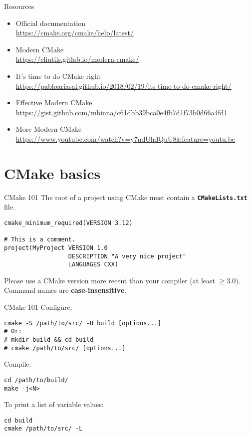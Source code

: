 \documentclass[aspectratio=169,11pt]{beamer}
\begin{document}
\begin{frame}{Resources}
\begin{itemize}
    \item Official documentation\\
    \url{https://cmake.org/cmake/help/latest/}
    \vfill
    \item Modern CMake\\
    \url{https://cliutils.gitlab.io/modern-cmake/}
    \vfill
    \item{It's time to do CMake right}\\
    \url{https://pabloariasal.github.io/2018/02/19/its-time-to-do-cmake-right/}
    \vfill
    \item Effective Modern CMake\\ \url{https://gist.github.com/mbinna/c61dbb39bca0e4fb7d1f73b0d66a4fd1}
    \vfill
    \item More Modern CMake\\ \url{https://www.youtube.com/watch?v=y7ndUhdQuU8&feature=youtu.be}
\end{itemize}
\end{frame}

\section{CMake basics}
\begin{frame}[fragile]{CMake 101}
The root of a project using CMake must contain a \textbf{\texttt{CMakeLists.txt}} file.

\begin{verbatim}
cmake_minimum_required(VERSION 3.12)

# This is a comment.
project(MyProject VERSION 1.0
                  DESCRIPTION "A very nice project"
                  LANGUAGES CXX)
\end{verbatim}
Please use a CMake version more recent than your compiler (at least \(\geq 3.0\)).
\vfill
Command names are \textbf{case-insensitive}.
\end{frame}

\begin{frame}[fragile]{CMake 101}
Configure:
\begin{verbatim}
cmake -S /path/to/src/ -B build [options...]
# Or:
# mkdir build && cd build
# cmake /path/to/src/ [options...]
\end{verbatim}
Compile:
\begin{verbatim}
cd /path/to/build/
make -j<N>
\end{verbatim}
To print a list of variable values:
\begin{verbatim}
cd build
cmake /path/to/src/ -L
\end{verbatim}
\end{frame}
\end{document}
